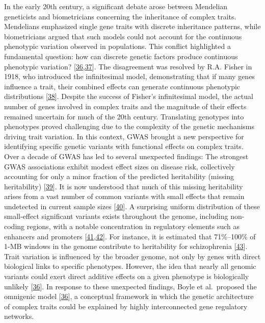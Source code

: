 In the early 20th century, a significant debate arose between Mendelian geneticists and biometricians concerning the inheritance of complex traits.
Mendelians emphasized single gene traits with discrete inheritance patterns, while biometricians argued that such models could not account for the continuous phenotypic variation observed in populations.
This conflict highlighted a fundamental question: how can discrete genetic factors produce continuous phenotypic variation? {[}\protect\hyperlink{ref-vpIDZCSa}{36},\protect\hyperlink{ref-15ldVppuv}{37}{]}.
The disagreement was resolved by R.A. Fisher in 1918, who introduced the infinitesimal model, demonstrating that if many genes influence a trait, their combined effects can generate continuous phenotypic distributions {[}\protect\hyperlink{ref-Qxk70FFV}{38}{]}.
Despite the success of Fisher's infinitesimal model, the actual number of genes involved in complex traits and the magnitude of their effects remained uncertain for much of the 20th century.
Translating genotypes into phenotypes proved challenging due to the complexity of the genetic mechanisms driving trait variation.
In this context, GWAS brought a new perspective for identifying specific genetic variants with functional effects on complex traits.
Over a decade of GWAS has led to several unexpected findings:
The strongest GWAS associations exhibit modest effect sizes on disease risk, collectively accounting for only a minor fraction of the predicted heritability (missing heritability) {[}\protect\hyperlink{ref-RASeYPIy}{39}{]}.
It is now understood that much of this missing heritability arises from a vast number of common variants with small effects that remain undetected in current sample sizes {[}\protect\hyperlink{ref-1AOy1zxAv}{40}{]}.
A surprising uniform distribution of these small-effect significant variants exists throughout the genome, including non-coding regions, with a notable concentration in regulatory elements such as enhancers and promoters {[}\protect\hyperlink{ref-mwTa2RUK}{41},\protect\hyperlink{ref-lVJVFaaZ}{42}{]}.
For instance, it is estimated that 71\%--100\% of 1-MB windows in the genome contribute to heritability for schizophrenia {[}\protect\hyperlink{ref-XvQe1H3A}{43}{]}.
Trait variation is influenced by the broader genome, not only by genes with direct biological links to specific phenotypes.
However, the idea that nearly all genomic variants could exert direct additive effects on a given phenotype is biologically unlikely {[}\protect\hyperlink{ref-vpIDZCSa}{36}{]}.
In response to these unexpected findings, Boyle et al.~proposed the omnigenic model {[}\protect\hyperlink{ref-vpIDZCSa}{36}{]}, a conceptual framework in which the genetic architecture of complex traits could be explained by highly interconnected gene regulatory networks.
